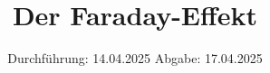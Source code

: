 

\subject{v46}
\title{Der Faraday-Effekt}
\date{%
  Durchführung: 14.04.2025
  \hspace{3em}
  Abgabe: 17.04.2025
}



\maketitle
\thispagestyle{empty}
\tableofcontents
\newpage






\printbibliography{}

